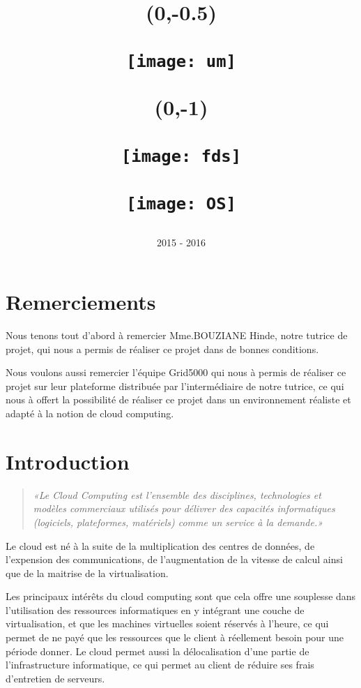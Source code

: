\documentclass{report}
\title{
    \begin{textblock}{\textwidth}(0,-0.5)
        \begin{flushleft}
            \texttt{[image: um]}
        \end{flushleft}
    \end{textblock}
    \begin{textblock}{\textwidth}(0,-1)
        \begin{flushright}
            \texttt{[image: fds]}
        \end{flushright}
    \end{textblock}
    \vspace{3 cm}
    \begin{minipage}\linewidth
    \vspace{3 cm}
        \huge\centering{
            RAPPORT DE PROJET\break
            Prise en main d'un environnement de Cloud : OpenStack
        }
        \vspace{1 cm}\bigbreak
        \texttt{[image: OS]}
    \end{minipage}
}
\author{%
    \begin{minipage}\linewidth
        \centering{
            Groupe : \break
            BENAIS Charles,\break
            BRESSAND Jérémy,\break
            CULTY Alexandre,\break
            ROGLIANO Théo\bigbreak
            Tutrice : BOUZIANE Hinde
        }
    \end{minipage}
    \vspace{1 cm}
    \date{2015 - 2016}
}
\begin{document}

\maketitle %

\tableofcontents %

\large %


\newpage
\chapter*{Remerciements}
    Nous tenons tout d'abord à remercier Mme.BOUZIANE Hinde, notre tutrice de projet, qui nous a permis de réaliser ce projet dans de bonnes conditions.\bigbreak

    Nous voulons aussi remercier l'équipe Grid5000 qui nous à permis de réaliser ce projet sur leur plateforme distribuée par l'intermédiaire de notre tutrice, ce qui nous à offert la possibilité de réaliser ce projet dans un environnement réaliste et adapté à la notion de cloud computing.



\newpage
\chapter{Introduction}

    \begin{quote}
        \textit{«Le Cloud Computing est l'ensemble des disciplines, technologies et modèles commerciaux utilisés pour délivrer des capacités informatiques (logiciels, plateformes, matériels) comme un service à la demande.» \cite{cloud_computing}} 
    \end{quote}
    \bigbreak

    Le cloud est né à la suite de la multiplication des centres de données, de l'expension des communications, de l'augmentation de la vitesse de calcul ainsi que de la maitrise de la virtualisation.
    \bigbreak
    
    Les principaux intérêts du cloud computing sont que cela offre une souplesse dans l'utilisation des ressources informatiques en y intégrant une couche de virtualisation, et que les machines virtuelles soient réservés à l'heure, ce qui permet de ne payé que les ressources que le client à réellement besoin pour une période donner.
    Le cloud permet aussi la délocalisation d'une partie de l'infrastructure informatique, ce qui permet au client de réduire ses frais d'entretien de serveurs.\bigbreak
    
\end{document}
